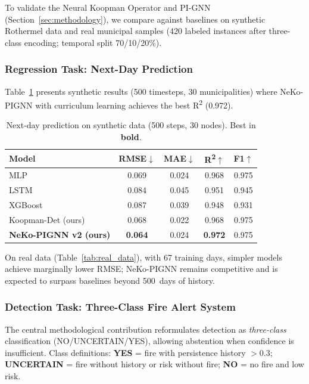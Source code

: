 \documentclass[preprint,times,numbers]{elsarticle}
\begin{document}
To validate the Neural Koopman Operator and PI-GNN (Section~\ref{sec:methodology}), we compare against baselines on synthetic Rothermel data and real municipal samples (420 labeled instances after three-class encoding; temporal split 70/10/20\%).

\subsubsection{Regression Task: Next-Day Prediction}

Table~\ref{tab:regression_synthetic} presents synthetic results (500 timesteps, 30 municipalities) where NeKo-PIGNN with curriculum learning achieves the best R\textsuperscript{2} (0.972).

\begin{table}[htbp]
\centering
\caption{Next-day prediction on synthetic data (500 steps, 30 nodes). Best in \textbf{bold}.}
\label{tab:regression_synthetic}
\small
\begin{tabular}{@{}lcccc@{}}
\toprule
\textbf{Model} & \textbf{RMSE}$\downarrow$ & \textbf{MAE}$\downarrow$ & \textbf{R\textsuperscript{2}}$\uparrow$ & \textbf{F1}$\uparrow$ \\
\midrule
MLP & 0.069 & 0.024 & 0.968 & 0.975 \\
LSTM & 0.084 & 0.045 & 0.951 & 0.945 \\
XGBoost & 0.087 & 0.039 & 0.948 & 0.931 \\
Koopman-Det (ours) & 0.068 & 0.022 & 0.968 & 0.975 \\
\textbf{NeKo-PIGNN v2 (ours)} & \textbf{0.064} & 0.024 & \textbf{0.972} & 0.975 \\
\bottomrule
\end{tabular}
\end{table}

On real data (Table~\ref{tab:real_data}), with 67 training days, simpler models achieve marginally lower RMSE; NeKo-PIGNN remains competitive and is expected to surpass baselines beyond 500~days of history.



\subsubsection{Detection Task: Three-Class Fire Alert System}

The central methodological contribution reformulates detection as \emph{three-class} classification (NO/UNCERTAIN/YES), allowing abstention when confidence is insufficient. Class definitions: \textbf{YES} = fire with persistence history $> 0.3$; \textbf{UNCERTAIN} = fire without history or risk without fire; \textbf{NO} = no fire and low risk.
\end{document}
